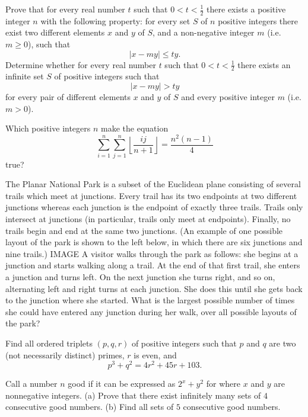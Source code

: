 \documentclass[11pt]{scrartcl}
\begin{document}
\begin{problem}[412405546768537]
Prove that for every real number $t$ such that $0 < t < \tfrac{1}{2}$ there exists a positive integer $n$ with the following property: for every set $S$ of $n$ positive integers there exist two different elements $x$ and $y$ of $S$, and a non-negative integer $m$ (i.e. $m \ge 0 $), such that\[ |x-my|\leq ty.\]
Determine whether for every real number $t$ such that $0 < t < \tfrac{1}{2} $ there exists an infinite set $S$ of positive integers such that\[|x-my| > ty\]for every pair of different elements $x$ and $y$ of $S$ and every positive integer $m$ (i.e. $m > 0$).
\end{problem}
\begin{problem}[819328919046836]
Which positive integers $n$ make the equation\[\sum_{i=1}^n \sum_{j=1}^n \left\lfloor \frac{ij}{n+1} \right\rfloor=\frac{n^2(n-1)}{4}\]true?
\end{problem}
\begin{problem}[313143209359080]
The Planar National Park is a subset of the Euclidean plane consisting of several trails which meet at junctions. Every trail has its two endpoints at two different junctions whereas each junction is the endpoint of exactly three trails. Trails only intersect at junctions (in particular, trails only meet at endpoints). Finally, no trails begin and end at the same two junctions. (An example of one possible layout of the park is shown to the left below, in which there are six junctions and nine trails.)
IMAGE 
A visitor walks through the park as follows: she begins at a junction and starts walking along a trail. At the end of that first trail, she enters a junction and turns left. On the next junction she turns right, and so on, alternating left and right turns at each junction. She does this until she gets back to the junction where she started. What is the largest possible number of times she could have entered any junction during her walk, over all possible layouts of the park?
\end{problem}
\begin{problem}[849916170311036]
	Find all ordered triplets $(p,q,r)$ of positive integers such that $p$ and $q$ are two (not necessarily distinct) primes, $r$ is even, and
\[p^3+q^2=4r^2+45r+103.\]
\end{problem}
\begin{problem}[723162974888793]
	Call a number $n$ good if it can be expressed as $2^x+y^2$ for where $x$ and $y$ are nonnegative integers.
(a) Prove that there exist infinitely many sets of $4$ consecutive good numbers.
(b) Find all sets of $5$ consecutive good numbers.
\end{problem}
\end{document}
